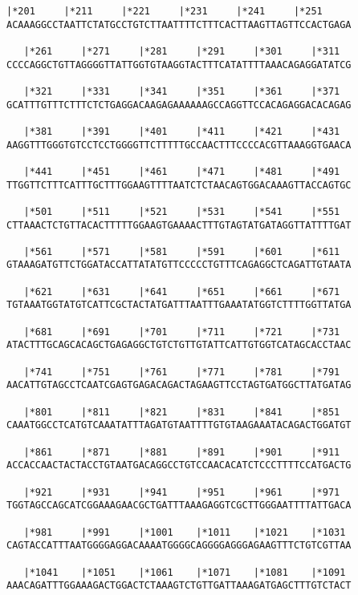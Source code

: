 \documentclass{article}
\begin{document}
\newpage
\begin{Verbatim}[fontfamily=courier]
   |*201     |*211     |*221     |*231     |*241     |*251  
ACAAAGGCCTAATTCTATGCCTGTCTTAATTTTCTTTCACTTAAGTTAGTTCCACTGAGA

   |*261     |*271     |*281     |*291     |*301     |*311  
CCCCAGGCTGTTAGGGGTTATTGGTGTAAGGTACTTTCATATTTTAAACAGAGGATATCG

   |*321     |*331     |*341     |*351     |*361     |*371  
GCATTTGTTTCTTTCTCTGAGGACAAGAGAAAAAAGCCAGGTTCCACAGAGGACACAGAG

   |*381     |*391     |*401     |*411     |*421     |*431  
AAGGTTTGGGTGTCCTCCTGGGGTTCTTTTTGCCAACTTTCCCCACGTTAAAGGTGAACA

   |*441     |*451     |*461     |*471     |*481     |*491  
TTGGTTCTTTCATTTGCTTTGGAAGTTTTAATCTCTAACAGTGGACAAAGTTACCAGTGC

   |*501     |*511     |*521     |*531     |*541     |*551  
CTTAAACTCTGTTACACTTTTTGGAAGTGAAAACTTTGTAGTATGATAGGTTATTTTGAT

   |*561     |*571     |*581     |*591     |*601     |*611  
GTAAAGATGTTCTGGATACCATTATATGTTCCCCCTGTTTCAGAGGCTCAGATTGTAATA

   |*621     |*631     |*641     |*651     |*661     |*671  
TGTAAATGGTATGTCATTCGCTACTATGATTTAATTTGAAATATGGTCTTTTGGTTATGA

   |*681     |*691     |*701     |*711     |*721     |*731  
ATACTTTGCAGCACAGCTGAGAGGCTGTCTGTTGTATTCATTGTGGTCATAGCACCTAAC

   |*741     |*751     |*761     |*771     |*781     |*791  
AACATTGTAGCCTCAATCGAGTGAGACAGACTAGAAGTTCCTAGTGATGGCTTATGATAG

   |*801     |*811     |*821     |*831     |*841     |*851  
CAAATGGCCTCATGTCAAATATTTAGATGTAATTTTGTGTAAGAAATACAGACTGGATGT

   |*861     |*871     |*881     |*891     |*901     |*911  
ACCACCAACTACTACCTGTAATGACAGGCCTGTCCAACACATCTCCCTTTTCCATGACTG

   |*921     |*931     |*941     |*951     |*961     |*971  
TGGTAGCCAGCATCGGAAAGAACGCTGATTTAAAGAGGTCGCTTGGGAATTTTATTGACA

   |*981     |*991     |*1001    |*1011    |*1021    |*1031 
CAGTACCATTTAATGGGGAGGACAAAATGGGGCAGGGGAGGGAGAAGTTTCTGTCGTTAA

   |*1041    |*1051    |*1061    |*1071    |*1081    |*1091 
AAACAGATTTGGAAAGACTGGACTCTAAAGTCTGTTGATTAAAGATGAGCTTTGTCTACT

\end{Verbatim}
\newpage
\end{document}
